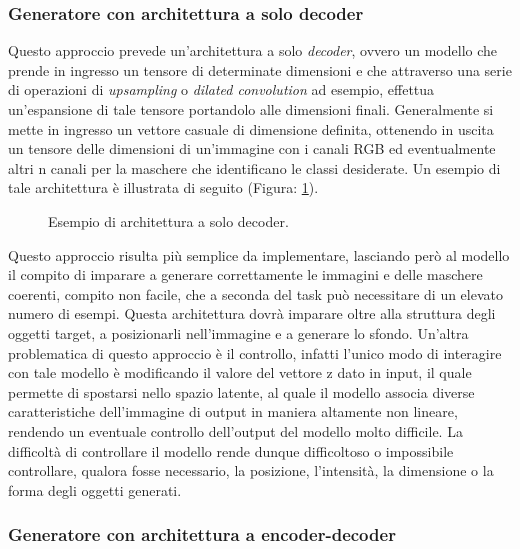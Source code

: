 \subsubsection{Generatore con architettura a solo decoder}

    Questo approccio prevede un'architettura a solo \textit{decoder}, ovvero un modello che prende in ingresso un tensore di determinate dimensioni e
    che attraverso una serie di operazioni di \textit{upsampling} o \textit{dilated convolution} ad esempio, effettua un'espansione di tale tensore
    portandolo alle dimensioni finali. 
    Generalmente si mette in ingresso un vettore casuale di dimensione definita, ottenendo in uscita un tensore delle dimensioni di un'immagine con i canali RGB 
    ed eventualmente altri n canali per la maschere che identificano le classi desiderate.
    Un esempio di tale architettura è illustrata di seguito (Figura: \ref{fig:decoder_only_architecture}).

    \begin{figure}[H]
        \centering
        
        \caption{Esempio di architettura a solo decoder.}
        \label{fig:decoder_only_architecture}
    \end{figure}

    Questo approccio risulta più semplice da implementare, lasciando però al modello il compito di imparare a generare correttamente
    le immagini e delle maschere coerenti, compito non facile, che a seconda del task può necessitare di un elevato numero di esempi. 
    Questa architettura dovrà imparare oltre alla struttura degli oggetti target, a posizionarli nell'immagine e a generare lo sfondo.
    Un'altra problematica di questo approccio è il controllo, infatti l'unico modo di interagire con tale modello è modificando il valore
    del vettore z dato in input, il quale permette di spostarsi nello spazio latente, al quale il modello associa diverse caratteristiche dell'immagine
    di output in maniera altamente non lineare, rendendo un eventuale controllo dell'output del modello molto difficile.
    La difficoltà di controllare il modello rende dunque difficoltoso o impossibile controllare, qualora fosse necessario, la posizione, l'intensità,
    la dimensione o la forma degli oggetti generati.

\subsubsection{Generatore con architettura a encoder-decoder}

